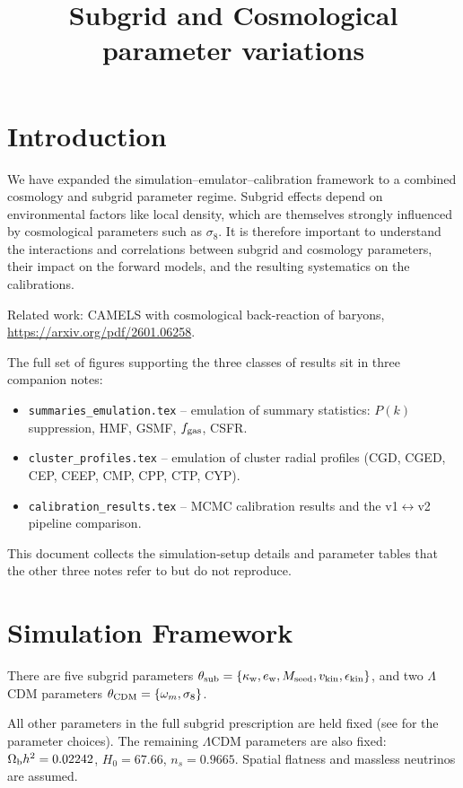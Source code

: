 \documentclass{article}
\begin{document}
\title{Subgrid and Cosmological parameter variations}
\maketitle
\section{Introduction}

We have expanded the simulation--emulator--calibration framework to a combined cosmology and subgrid parameter regime. Subgrid effects depend on environmental factors like local density, which are themselves strongly influenced by cosmological parameters such as $\sigma_8$. It is therefore important to understand the interactions and correlations between subgrid and cosmology parameters, their impact on the forward models, and the resulting systematics on the calibrations.

Related work: CAMELS with cosmological back-reaction of baryons, \url{https://arxiv.org/pdf/2601.06258}.

The full set of figures supporting the three classes of results sit in three companion notes:
\begin{itemize}
  \item \texttt{summaries\_emulation.tex} -- emulation of summary statistics: $P(k)$ suppression, HMF, GSMF, $f_{\rm gas}$, CSFR.
  \item \texttt{cluster\_profiles.tex} -- emulation of cluster radial profiles (CGD, CGED, CEP, CEEP, CMP, CPP, CTP, CYP).
  \item \texttt{calibration\_results.tex} -- MCMC calibration results and the v1$\leftrightarrow$v2 pipeline comparison.
\end{itemize}
This document collects the simulation-setup details and parameter tables that the other three notes refer to but do not reproduce.

\section{Simulation Framework}
\label{sec:data}


There are five subgrid parameters
$\theta_{\rm sub}=\{\kappa_\mathrm{w}, e_\mathrm{w}, M_\mathrm{seed}, v_\mathrm{kin}, \epsilon_\mathrm{kin}\}$,
and two $\Lambda$CDM parameters
$\theta_{\rm CDM}=\{\omega_m,\sigma_8\}$.


All other parameters in the full subgrid prescription are held fixed (see \cite{frontiere2025modeling} for the parameter choices). The remaining $\Lambda$CDM parameters are also fixed:
$\Omega_{\rm b}h^2=0.02242$, $H_0=67.66$, $n_s=0.9665$. Spatial flatness and massless neutrinos are assumed.
\end{document}
